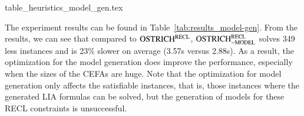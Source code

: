 \begin{table}[htbp]
  {table_heuristics_model_gen.tex}
  \caption{Evaluation of the optimizations for the model generation in Section~\ref{sec-opt-sol-gen}}\label{tab:results_model-gen}
\end{table}

The experiment results can be found in Table~\ref{tab:results_model-gen}. From the results, we can see that compared to $\rm OSTRICH^{RECL}$, $\rm OSTRICH^{RECL}_{\rm -MODEL}$ solves 349 less instances and is 23\% slower on average (3.57s versus 2.88s). As a result, the optimization for the model generation does improve the performance, especially when the sizes of the CEFAs are huge.  
Note that the optimization for model generation only affects the satisfiable instances, that is, those instances where the generated LIA formulas can be solved, but the generation of models for these RECL constraints is unsuccessful. 



